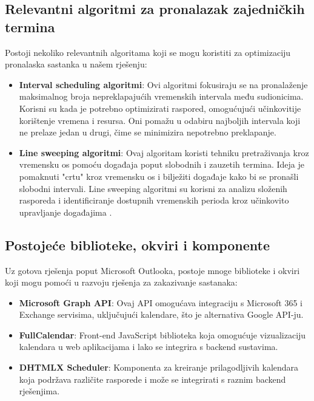 \documentclass{foi}
\begin{document}
\subsection{Relevantni algoritmi za pronalazak zajedničkih termina}

Postoji nekoliko relevantnih algoritama koji se mogu koristiti za optimizaciju pronalaska sastanka u našem rješenju:

\begin{itemize}
    \item \textbf{Interval scheduling algoritmi}: Ovi algoritmi fokusiraju se na pronalaženje maksimalnog broja nepreklapajućih vremenskih intervala među sudionicima. Korisni su kada je potrebno optimizirati raspored, omogućujući učinkovitije korištenje vremena i resursa. Oni pomažu u odabiru najboljih intervala koji ne prelaze jedan u drugi, čime se minimizira nepotrebno preklapanje.
    \item \textbf{Line sweeping algoritmi}: Ovaj algoritam koristi tehniku pretraživanja kroz vremensku os pomoću događaja poput slobodnih i zauzetih termina. Ideja je pomaknuti "crtu" kroz vremensku os i bilježiti događaje kako bi se pronašli slobodni intervali. Line sweeping algoritmi su korisni za analizu složenih rasporeda i identificiranje dostupnih vremenskih perioda kroz učinkovito upravljanje događajima \cite{GreedyAlgorithms2024}.
\end{itemize}

\subsection{Postojeće biblioteke, okviri i komponente}

Uz gotova rješenja poput Microsoft Outlooka, postoje mnoge biblioteke i okviri koji mogu pomoći u razvoju rješenja za zakazivanje sastanaka:

\begin{itemize}
    \item \textbf{Microsoft Graph API}: Ovaj API omogućava integraciju s Microsoft 365 i Exchange servisima, uključujući kalendare, što je alternativa Google API-ju.
    \item \textbf{FullCalendar}: Front-end JavaScript biblioteka koja omogućuje vizualizaciju kalendara u web aplikacijama i lako se integrira s backend sustavima.
    \item \textbf{DHTMLX Scheduler}: Komponenta za kreiranje prilagodljivih kalendara koja podržava različite rasporede i može se integrirati s raznim backend rješenjima.
\end{itemize}
\end{document}

